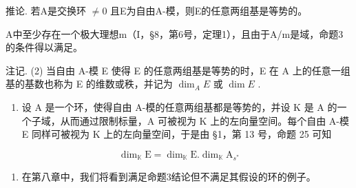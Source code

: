 推论. 若A是交换环 \(\neq0\) 且E为自由A-模，则E的任意两组基是等势的。

A中至少存在一个极大理想m（I，§8，第6号，定理1），且由于A/m是域，命题3的条件得以满足。

注记. (2) 当自由 A-模 E 使得 E 的任意两组基是等势的时，E 在 A 上的任意一组基的基数也称为 E 的维数或秩，并记为 \(\dim_{A}E\) 或 \(\dim E\) .

\begin{enumerate}
\def\labelenumi{(\arabic{enumi})}
\setcounter{enumi}{2}
\tightlist
\item
  设 A 是一个环，使得自由 A-模的任意两组基都是等势的，并设 K 是 A 的一个子域，从而通过限制标量，A 可被视为 K 上的左向量空间。每个自由 A-模 E 同样可被视为 K 上的左向量空间，于是由 §1，第 13 号，命题 25 可知
\end{enumerate}

\[
\dim_ {\mathbb {K}} \mathrm{E} = \dim_ {\mathbb {K}} \mathrm{E}. \dim_ {\mathbb {K}} \mathrm{A} _ {s ^ {*}}\tag{2}
\]

\begin{enumerate}
\def\labelenumi{(\arabic{enumi})}
\setcounter{enumi}{3}
\tightlist
\item
  在第八章中，我们将看到满足命题3结论但不满足其假设的环的例子。
\end{enumerate}
